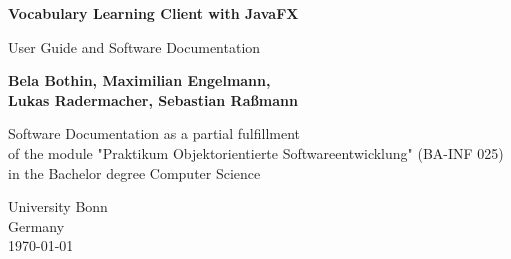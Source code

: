 \begin{titlepage}

    \begin{center}
        \vspace*{1cm}
            
        \Huge
        \textbf{Vocabulary Learning Client with JavaFX}
            
        \vspace{0.5cm}
        \LARGE
        User Guide and Software Documentation
            
        \vspace{1.5cm}
            
        \textbf{Bela Bothin, Maximilian Engelmann,\\Lukas Radermacher, Sebastian Raßmann}
            
        \vfill
            
        Software Documentation as a partial fulfillment
    \\ of the module "Praktikum Objektorientierte Softwareentwicklung" (BA-INF 025) \\
    in the Bachelor degree Computer Science
            
        \vspace{3cm}
        
        \Large
        University Bonn\\
        Germany\\
        \today
            
            
    \end{center}
\end{titlepage}